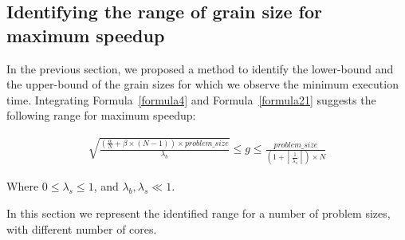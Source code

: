 \vspace{\baselineskip}
\subsection{Identifying the range of grain size for maximum speedup}
In the previous section, we proposed a method to identify the lower-bound and the upper-bound of the grain sizes for which we observe the minimum execution time. 
Integrating Formula~\ref{formula4} and Formula~\ref{formula21} suggests the following range for maximum speedup:


\begin{equation}\label{formula23}
\begin{aligned}
{\sqrt{\frac{(\frac{\alpha}{N}+\beta\times(N-1))\times{problem\_{size}}}{{\lambda_b}}}}\leq{g}\leq\frac{problem\_{size}}{(1+\left\lceil{\frac{1}{\lambda_s}}\right\rceil)\times{N}}
\end{aligned}
\end{equation}
 
Where $0\leq\lambda_s\leq1$, and $\lambda_b,\lambda_s\ll1$.

In this section we represent the identified range for a number of problem sizes, with different number of cores.





